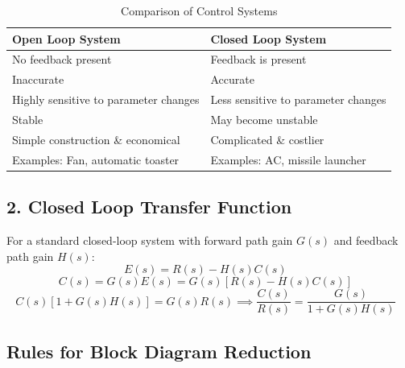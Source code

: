 \documentclass[12pt]{article}
\begin{document}
\begin{table}[h]
\centering
\begin{tabular}{@{}ll@{}}
\toprule
\textbf{Open Loop System} & \textbf{Closed Loop System} \\ \midrule
No feedback present  & Feedback is present  \\
Inaccurate  & Accurate  \\
Highly sensitive to parameter changes  & Less sensitive to parameter changes  \\
Stable  & May become unstable  \\
Simple construction \& economical  & Complicated \& costlier  \\
Examples: Fan, automatic toaster  & Examples: AC, missile launcher  \\ \bottomrule
\end{tabular}
\caption{Comparison of Control Systems}
\end{table}

\subsection*{2. Closed Loop Transfer Function}
For a standard closed-loop system with forward path gain $G(s)$ and feedback path gain $H(s)$:
\[ E(s) = R(s) - H(s)C(s) \text{  } \]
\[ C(s) = G(s)E(s) = G(s)[R(s) - H(s)C(s)] \text{  } \]
\[ C(s)[1 + G(s)H(s)] = G(s)R(s) \implies \frac{C(s)}{R(s)} = \frac{G(s)}{1 + G(s)H(s)} \text{  } \]

\subsection{Rules for Block Diagram Reduction}

\end{document}
